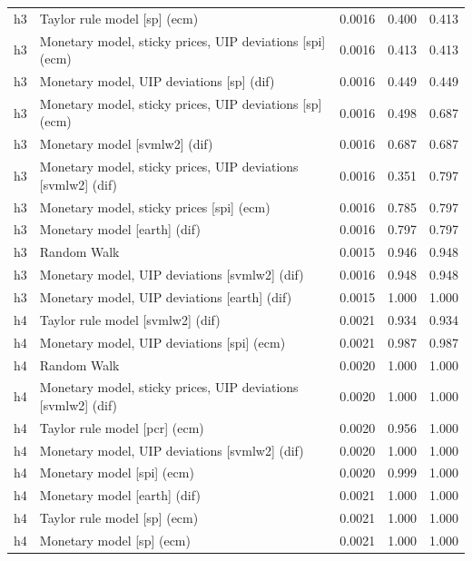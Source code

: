 \begin{ThreePartTable}
\begin{longtable}[t]{cp{5.5cm}ccc}
\addlinespace
h3 & \raggedright Taylor rule model [sp] (ecm) & 0.0016 & 0.400 & 0.413\\
h3 & \raggedright Monetary model, sticky prices, UIP deviations [spi] (ecm) & 0.0016 & 0.413 & 0.413\\
h3 & \raggedright Monetary model, UIP deviations [sp] (dif) & 0.0016 & 0.449 & 0.449\\
h3 & \raggedright Monetary model, sticky prices, UIP deviations [sp] (ecm) & 0.0016 & 0.498 & 0.687\\
h3 & \raggedright Monetary model [svmlw2] (dif) & 0.0016 & 0.687 & 0.687\\
h3 & \raggedright Monetary model, sticky prices, UIP deviations [svmlw2] (dif) & 0.0016 & 0.351 & 0.797\\
h3 & \raggedright Monetary model, sticky prices [spi] (ecm) & 0.0016 & 0.785 & 0.797\\
h3 & \raggedright Monetary model [earth] (dif) & 0.0016 & 0.797 & 0.797\\
h3 & \raggedright Random Walk & 0.0015 & 0.946 & 0.948\\
h3 & \raggedright Monetary model, UIP deviations [svmlw2] (dif) & 0.0016 & 0.948 & 0.948\\
h3 & \raggedright Monetary model, UIP deviations [earth] (dif) & 0.0015 & 1.000 & 1.000\\
\addlinespace
h4 & \raggedright Taylor rule model [svmlw2] (dif) & 0.0021 & 0.934 & 0.934\\
h4 & \raggedright Monetary model, UIP deviations [spi] (ecm) & 0.0021 & 0.987 & 0.987\\
h4 & \raggedright Random Walk & 0.0020 & 1.000 & 1.000\\
h4 & \raggedright Monetary model, sticky prices, UIP deviations [svmlw2] (dif) & 0.0020 & 1.000 & 1.000\\
h4 & \raggedright Taylor rule model [pcr] (ecm) & 0.0020 & 0.956 & 1.000\\
h4 & \raggedright Monetary model, UIP deviations [svmlw2] (dif) & 0.0020 & 1.000 & 1.000\\
h4 & \raggedright Monetary model [spi] (ecm) & 0.0020 & 0.999 & 1.000\\
h4 & \raggedright Monetary model [earth] (dif) & 0.0021 & 1.000 & 1.000\\
h4 & \raggedright Taylor rule model [sp] (ecm) & 0.0021 & 1.000 & 1.000\\
h4 & \raggedright Monetary model [sp] (ecm) & 0.0021 & 1.000 & 1.000\\

\end{longtable}
\end{ThreePartTable}
